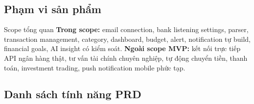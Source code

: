 \documentclass[11pt,a4paper]{article}
\begin{document}
\subsection{Phạm vi sản phẩm}
\begin{summarybox}{Scope tổng quan}
\textbf{Trong scope:} email connection, bank listening settings, parser, transaction management, category, dashboard, budget, alert, notification tự build, financial goals, AI insight có kiểm soát.\newline
\textbf{Ngoài scope MVP:} kết nối trực tiếp API ngân hàng thật, tư vấn tài chính chuyên nghiệp, tự động chuyển tiền, thanh toán, investment trading, push notification mobile phức tạp.
\end{summarybox}

\subsection{Danh sách tính năng PRD}
\end{document}
